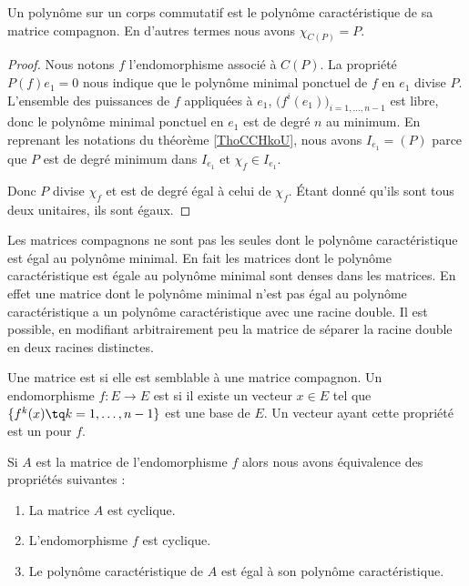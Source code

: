 \begin{lemma} \label{LemkVNisk}
    Un polynôme sur un corps commutatif est le polynôme caractéristique de sa matrice compagnon. En d'autres termes nous avons \( \chi_{C(P)}=P\).
\end{lemma}

\begin{proof}
    Nous notons \( f\) l'endomorphisme associé à \( C(P)\). La propriété \( P(f)e_1=0\) nous indique que le polynôme minimal ponctuel de \( f\) en \( e_1\) divise \( P\). L'ensemble des puissances de \( f\) appliquées à \( e_1\), \( \big( f^i(e_1) \big)_{i=1,\ldots, n-1}\) est libre, donc le polynôme minimal ponctuel en \( e_1\) est de degré \( n\) au minimum. En reprenant les notations du théorème \ref{ThoCCHkoU}, nous avons \( I_{e_1}=(P)\) parce que \( P\) est de degré minimum dans \( I_{e_1}\) et \( \chi_f\in I_{e_1}\).

    Donc \( P\) divise \( \chi_f\) et est de degré égal à celui de \( \chi_f\). Étant donné qu'ils sont tous deux unitaires, ils sont égaux.
\end{proof}

\begin{remark}  \label{RemmQjZOA}
    Les matrices compagnons ne sont pas les seules dont le polynôme caractéristique est égal au polynôme minimal. En fait les matrices dont le polynôme caractéristique est égale au polynôme minimal sont denses dans les matrices. En effet une matrice dont le polynôme minimal n'est pas égal au polynôme caractéristique a un polynôme caractéristique avec une racine double. Il est possible, en modifiant arbitrairement peu la matrice de séparer la racine double en deux racines distinctes.
\end{remark}

\begin{definition}
    Une matrice est  si elle est semblable à une matrice compagnon. Un endomorphisme \( f\colon E\to E\) est  si il existe un vecteur \( x\in E\) tel que \( \{ f^k(x)\tq k=1,\ldots, n-1 \}\) est une base de \( E\). Un vecteur ayant cette propriété est un  pour \( f\).
\end{definition}

\begin{lemma}\label{LemSGmdnE}
    Si \( A\) est la matrice de l'endomorphisme \( f\) alors nous avons équivalence des propriétés suivantes :
    \begin{enumerate}
        \item
            La matrice \( A\) est cyclique.
        \item
            L'endomorphisme \( f\) est cyclique.
        \item
            Le polynôme caractéristique de \( A\) est égal à son polynôme caractéristique.
    \end{enumerate}
\end{lemma}

